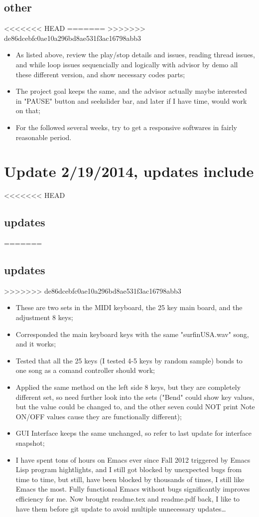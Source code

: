 \documentclass[9pt,b5paper]{article}
\begin{document}
\subsection{other}
<<<<<<< HEAD
\label{sec-5-2}
=======
\label{sec-4-2}
>>>>>>> de86dcebfc0ae10a296bd8ae531f3ac16798abb3
\begin{itemize}
\item As listed above, review the play/stop details and issues, reading thread issues, and while loop issues sequencially and logically with advisor by demo all these different version, and show necessary codes parts;
\item The project goal keeps the same, and the advisor actually maybe interested in "PAUSE" button and seekslider bar, and later if I have time, would work on that;
\item For the followed several weeks, try to get a responsive softwares in fairly reasonable period.
\end{itemize}

\section{Update 2/19/2014, updates include}
<<<<<<< HEAD
\label{sec-6}
\subsection{updates}
\label{sec-6-1}
=======
\label{sec-5}
\subsection{updates}
\label{sec-5-1}
>>>>>>> de86dcebfc0ae10a296bd8ae531f3ac16798abb3
\begin{itemize}
\item These are two sets in the MIDI keyboard, the 25 key main board, and the adjustment 8 keys;
\item Corresponded the main keyboard keys with the same "surfinUSA.wav" song, and it works;
\item Tested that all the 25 keys (I tested 4-5 keys by random sample) bonds to one song as a comand controller should work;
\item Applied the same method on the left side 8 keys, but they are completely different set, so need further look into the sets ("Bend" could show key values, but the value could be changed to, and the other seven could NOT print Note ON/OFF values cause they are functionally different);
\item GUI Interface keeps the same unchanged, so refer to last update for interface snapshot;
\item I have spent tons of hours on Emacs ever since Fall 2012 triggered by Emacs Lisp program hightlights, and I still got blocked by unexpected bugs from time to time, but still, have been blocked by thousands of times, I still like Emacs the most. Fully functional Emacs without bugs significantly improves efficiency for me. Now brought readme.tex and readme.pdf back, I like to have them before git update to avoid multiple unnecessary updates\ldots{}
\end{itemize}
\end{document}
